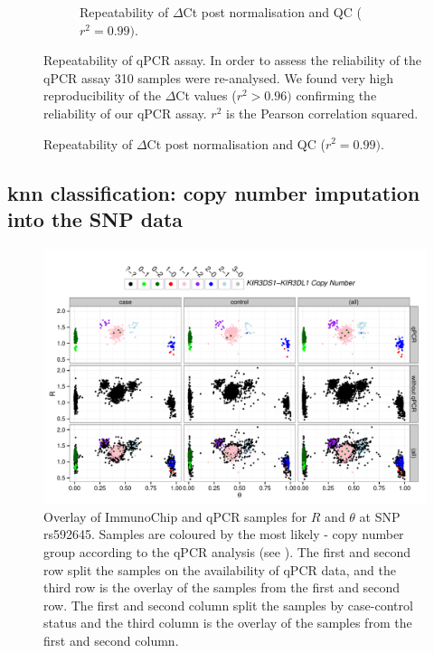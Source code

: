 \begin{figure}[h]
\begin{subfigure}[b]{.4\textwidth}
        \caption{Repeatability of  $\Delta$Ct post normalisation and QC ($r^{2}=0.99)$.}
        \label{}
    \end{subfigure}
    {Repeatability of qPCR assay.}
    {
        In order to assess the reliability of the qPCR assay 310 samples were re-analysed.
        We found very high reproducibility of the $\Delta$Ct values ($r^{2} > 0.96)$ confirming the reliability of our qPCR assay.
        $r^2$ is the Pearson correlation squared.
    }
\end{figure} 




\subsection{\gls{knn} classification: copy number imputation into the SNP data}

\begin{figure}[h!]
  \centering
  \includegraphics[scale=.5]{figures/Figure-2.pdf}
  {Overlay of ImmunoChip and qPCR samples for $R$ and $\theta$ at SNP rs592645.}
  { Samples are coloured by the most likely - copy number
  group according to the qPCR analysis (see ).  The
  first and second row split the samples on the availability of qPCR data, and
  the third row is the overlay of the samples from the first and second row.
  The first and second column split the samples by case-control status and the
  third column is the overlay of the samples from the first and second column.}
\end{figure}

